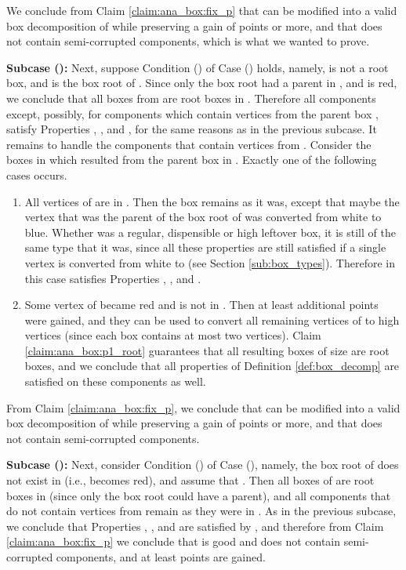 \documentclass[11pt]{article}
\def\dnsitem{\vspace{-7pt}\item}
\theoremstyle{definition}
\begin{document}
	We conclude from Claim \ref{claim:ana_box:fix_p} that  can be modified into a valid box decomposition of  while preserving a gain of  points or more, and that  does not contain semi-corrupted components, which is what we wanted to prove.
	
\smallskip
\par\noindent
{\bf Subcase ():}
	Next, suppose Condition () of Case () holds, namely,
	 is not a root box, and  is the box root of .
	Since only the box root  had a parent in , and  is red, we conclude that all boxes from  are root boxes in .
	Therefore all components except, possibly, for components which contain vertices from the parent box , 
	satisfy Properties , ,  and , for the same reasons as in the previous subcase.
	It remains to handle the components that contain vertices from .
	Consider the boxes  in  which resulted from the parent box  in .
	Exactly one of the following cases occurs.
	\begin{enumerate}
		\dnsitem All vertices of  are in .
		Then the box  remains as it was, except that maybe the vertex  that was the parent of the box root  of  was converted from white to blue.
		Whether  was a regular, dispensible or high leftover box, it is still of the same type that it was, since all these properties are still satisfied if a single vertex is converted from white to  (see Section \ref{sub:box_types}). 
		Therefore in this case  satisfies Properties , ,  and . 
		
		\dnsitem Some vertex of  became red and is not in .
		Then at least  additional points were gained, and they can be used to convert all remaining vertices of  to high vertices (since each box contains at most two  vertices).
		Claim \ref{claim:ana_box:p1_root} guarantees that all resulting boxes of size  are root boxes, and we conclude that all properties of Definition \ref{def:box_decomp} are satisfied on these components as well.
	\end{enumerate}

	From Claim \ref{claim:ana_box:fix_p}, we conclude that  can be modified into a valid box decomposition of  while preserving a gain of  points or more, and that  does not contain semi-corrupted components.

\smallskip
\par\noindent
{\bf Subcase ():}
	Next, consider Condition () of Case (), namely,
	the box root  of  does not exist in  (i.e.,  becomes red), and assume that .
	Then all boxes of  are root boxes in  (since only the box root  could have a parent), and all components that do not contain vertices from  remain as they were in .
	As in the previous subcase, 
	we conclude that Properties , ,  and  are satisfied by , and therefore from Claim
	\ref{claim:ana_box:fix_p} we conclude that  is good and does not contain semi-corrupted components, and at least  points are gained.
	
\end{document}
